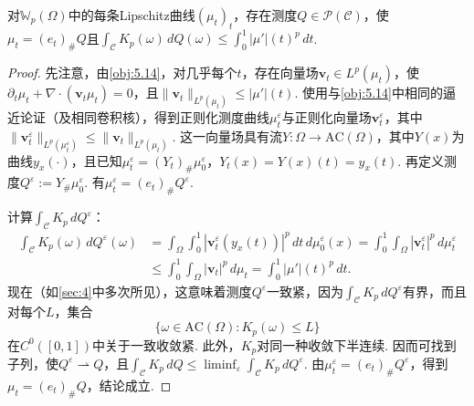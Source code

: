 \begin{proposition}\label{obj:5.31}
对$\mathbb W_p(\Omega)$中的每条Lipschitz曲线$(\mu_t)_t$，存在测度$Q\in\mathscr P(\mathscr C)$，使$\mu_t=(e_t)_\#Q$且$\int_{\mathscr C}K_p(\omega)\,dQ(\omega)\le\int_0^1|\mu'|(t)^p\,dt$.
\end{proposition}
\begin{proof}
先注意，由\autoref{obj:5.14}，对几乎每个$t$，存在向量场$\mathbf v_t\in L^p(\mu_t)$，使$\partial_t\mu_t+\nabla\cdot(\mathbf v_t\mu_t)=0$，且$\|\mathbf v_t\|_{L^p(\mu_t)}\le|\mu'|(t)$. 使用与\autoref{obj:5.14}中相同的逼近论证（及相同卷积核），得到正则化测度曲线$\mu_t^\varepsilon$与正则化向量场$\mathbf v_t^\varepsilon$，其中$\|\mathbf v_t^\varepsilon\|_{L^p(\mu_t^\varepsilon)}\le\|\mathbf v_t\|_{L^p(\mu_t)}$. 这一向量场具有流$Y:\Omega\to\mathrm{AC}(\Omega)$，其中$Y(x)$为曲线$y_x(\cdot)$，且已知$\mu_t^\varepsilon=(Y_t)_\#\mu_0^\varepsilon$，$Y_t(x)=Y(x)(t)=y_x(t)$. 再定义测度$Q^\varepsilon:=Y_\#\mu_0^\varepsilon$. 有$\mu_t^\varepsilon=(e_t)_\#Q^\varepsilon$.

计算$\int_{\mathscr C}K_p\,dQ^\varepsilon$：
\[
\begin{aligned}
\int_{\mathscr C}K_p(\omega)\,dQ^\varepsilon(\omega)
&=\int_\Omega\int_0^1|\mathbf v_t^\varepsilon(y_x(t))|^p\,dt\,d\mu_0^\varepsilon(x)
=\int_0^1\int_\Omega|\mathbf v_t^\varepsilon|^p\,d\mu_t^\varepsilon\\
&\le\int_0^1\int_\Omega|\mathbf v_t|^p\,d\mu_t
=\int_0^1|\mu'|(t)^p\,dt.
\end{aligned}
\]
现在（如\autoref{sec:4}中多次所见），这意味着测度$Q^\varepsilon$一致紧，因为$\int_{\mathscr C}K_p\,dQ^\varepsilon$有界，而且对每个$L$，集合
\[
\{\omega\in\mathrm{AC}(\Omega):K_p(\omega)\le L\}
\]
在$C^0([0,1])$中关于一致收敛紧. 此外，$K_p$对同一种收敛下半连续. 因而可找到子列，使$Q^\varepsilon\rightharpoonup Q$，且$\int_{\mathscr C}K_p\,dQ\le\liminf_\varepsilon\int_{\mathscr C}K_p\,dQ^\varepsilon$. 由$\mu_t^\varepsilon=(e_t)_\#Q^\varepsilon$，得到$\mu_t=(e_t)_\#Q$，结论成立.
\end{proof}

